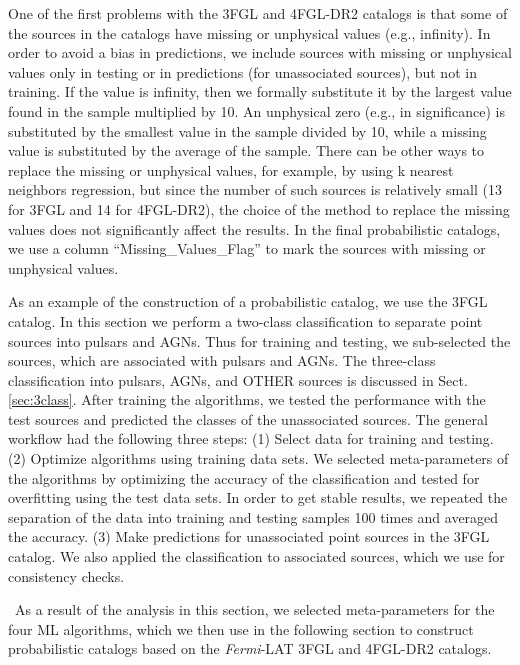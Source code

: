 \documentclass[referee]{aa} %
\newcommand{\Fermi}{\textit{Fermi}\xspace}
\begin{document}
One of the first problems with the 3FGL and 4FGL-DR2 catalogs is that
some of the sources in the catalogs have missing or unphysical values (e.g., infinity).
In order to avoid a bias in predictions, we include sources with missing or unphysical values only in testing or in predictions (for unassociated sources), but not in training.
If the value is infinity, then we formally substitute it by the largest value found in the sample multiplied by 10.
An unphysical zero (e.g., in significance) is substituted by the smallest value in the sample divided by 10,
while a missing value is substituted by the average of the sample.
There can be other ways to replace the missing or unphysical values, for example, by using k nearest neighbors regression, 
but since the number of such sources is relatively small (13 for 3FGL and 14 for 4FGL-DR2), 
the choice of the method to replace the missing values does not significantly affect the results.
In the final probabilistic catalogs, we use a column ``Missing\_Values\_Flag'' to mark 
the sources with missing or unphysical values.

As an example of the construction of a probabilistic catalog, we use the 3FGL catalog.
In this section we perform a two-class classification to separate point sources into pulsars and AGNs.
Thus for training and testing, we sub-selected the sources, which are associated with pulsars and AGNs.
The three-class classification into pulsars, AGNs, and OTHER sources is discussed in Sect. \ref{sec:3class}.
After training the algorithms, we tested the performance with the test sources and predicted the classes of the unassociated sources.
The general workflow had the following three steps: (1) Select data for training and testing. (2) Optimize algorithms using training data sets.
We selected meta-parameters of the algorithms by optimizing the accuracy of the classification and tested for overfitting using the test data sets.
In order to get stable results, we repeated the separation of the data into training and testing samples 100 times and 
averaged the accuracy. (3)
Make predictions for unassociated point sources in the 3FGL catalog.
We also applied the classification to associated sources, which we use for consistency checks.

\
As a result of the analysis in this section, we selected meta-parameters for the four ML algorithms,
which we then use in the following section to construct probabilistic catalogs
based on the \Fermi-LAT 3FGL and 4FGL-DR2 catalogs.
\end{document}
